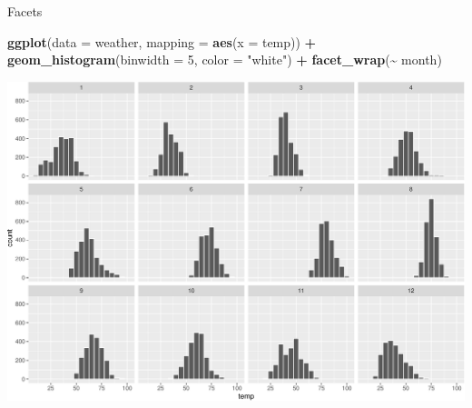 \documentclass[
  ignorenonframetext,
]{beamer}
\newenvironment{Shaded}{\begin{snugshade}}{\end{snugshade}}
\newcommand{\AttributeTok}[1]{\textcolor[rgb]{0.13,0.29,0.53}{#1}}
\newcommand{\DecValTok}[1]{\textcolor[rgb]{0.00,0.00,0.81}{#1}}
\newcommand{\FunctionTok}[1]{\textcolor[rgb]{0.13,0.29,0.53}{\textbf{#1}}}
\newcommand{\NormalTok}[1]{#1}
\newcommand{\SpecialCharTok}[1]{\textcolor[rgb]{0.81,0.36,0.00}{\textbf{#1}}}
\newcommand{\StringTok}[1]{\textcolor[rgb]{0.31,0.60,0.02}{#1}}
\begin{document}
\begin{frame}[fragile]{Facets}
\protect\hypertarget{facets-1}{}
\tiny

\begin{Shaded}
\begin{Highlighting}[]
\FunctionTok{ggplot}\NormalTok{(}\AttributeTok{data =}\NormalTok{ weather, }\AttributeTok{mapping =} \FunctionTok{aes}\NormalTok{(}\AttributeTok{x =}\NormalTok{ temp)) }\SpecialCharTok{+}
  \FunctionTok{geom\_histogram}\NormalTok{(}\AttributeTok{binwidth =} \DecValTok{5}\NormalTok{, }\AttributeTok{color =} \StringTok{"white"}\NormalTok{) }\SpecialCharTok{+}
  \FunctionTok{facet\_wrap}\NormalTok{(}\SpecialCharTok{\textasciitilde{}}\NormalTok{ month)}
\end{Highlighting}
\end{Shaded}

\begin{center}\includegraphics[width=0.7\linewidth,height=0.7\textheight]{Week2_files/figure-beamer/unnamed-chunk-31-1} \end{center}
\normalsize
\end{frame}
\end{document}
